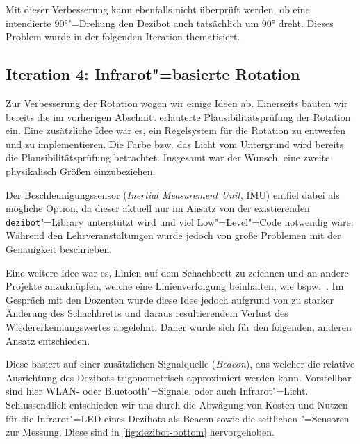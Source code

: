 Mit dieser Verbesserung kann ebenfalls nicht überprüft werden, ob eine intendierte 90°"=Drehung den Dezibot auch tatsächlich um 90° dreht. Dieses Problem wurde in der folgenden Iteration thematisiert.


\subsection{Iteration 4: Infrarot"=basierte Rotation}
\label{sec:movement-ir}

Zur Verbesserung der Rotation wogen wir einige Ideen ab. Einerseits bauten wir bereits die im vorherigen Abschnitt erläuterte Plausibilitätsprüfung der Rotation ein. Eine zusätzliche Idee war es, ein Regelsystem für die Rotation zu entwerfen und zu implementieren. Die Farbe bzw. das Licht vom Untergrund wird bereits die Plausibilitätsprüfung betrachtet. Insgesamt war der Wunsch, eine zweite physikalisch Größen einzubeziehen.

Der Beschleunigungssensor (\emph{Inertial Measurement Unit}, IMU) entfiel dabei als mögliche Option, da dieser aktuell nur im Ansatz von der existierenden \texttt{dezibot}"=Library unterstützt wird und viel Low"=Level"=Code notwendig wäre. Während den Lehrveranstaltungen wurde jedoch von große Problemen mit der Genauigkeit beschrieben.

Eine weitere Idee war es, Linien auf dem Schachbrett zu zeichnen und an andere Projekte anzuknüpfen, welche eine Linienverfolgung beinhalten, wie bspw.~\cite{antonovSnskorpion2DezibotLabyrinthSolver2025}. Im Gespräch mit den Dozenten wurde diese Idee jedoch aufgrund von zu starker Änderung des Schachbretts und daraus resultierendem Verlust des Wiedererkennungswertes abgelehnt. Daher wurde sich für den folgenden, anderen Ansatz entschieden.

Diese basiert auf einer zusätzlichen Signalquelle (\emph{Beacon}), aus welcher die relative Ausrichtung des Dezibots trigonometrisch approximiert werden kann. Vorstellbar sind hier WLAN- oder Bluetooth"=Signale, oder auch Infrarot"=Licht. Schlussendlich entschieden wir uns durch die Abwägung von Kosten und Nutzen für die Infrarot"=LED eines Dezibots als Beacon sowie die seitlichen "=Sensoren zur Messung. Diese sind in \autoref{fig:dezibot-bottom} hervorgehoben.

